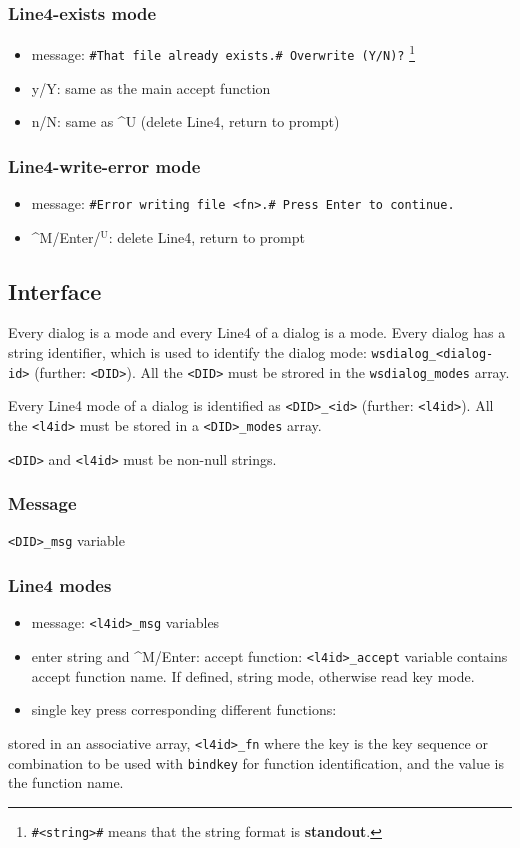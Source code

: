\documentclass[11pt]{article}
\begin{document}
\subsubsection{Line4-exists mode}
\label{sec-1-3-1}
\begin{itemize}
\item message: \texttt{\#That file already exists.\#  Overwrite (Y/N)?} \footnote{\texttt{\#<string>\#} means that the string format is \textbf{standout}.}
\item y/Y: same as the main accept function
\item n/N: same as \^{}U (delete Line4, return to prompt)
\end{itemize}

\subsubsection{Line4-write-error mode}
\label{sec-1-3-2}
\begin{itemize}
\item message: \texttt{\#Error writing file <fn>.\# Press Enter to continue.}
\item \^{}M/Enter/$^{\text{U}}$: delete Line4, return to prompt
\end{itemize}

\subsection{Interface}
\label{sec-1-4}
Every dialog is a mode and every Line4 of a dialog is a mode.  Every
dialog has a string identifier, which is used to identify the dialog
mode: \verb~wsdialog_<dialog-id>~ (further: \verb~<DID>~).  All the \verb~<DID>~ must
be strored in the \verb~wsdialog_modes~ array.

Every Line4 mode of a dialog is identified as \verb~<DID>_<id>~ (further:
\verb~<l4id>~).  All the \verb~<l4id>~ must be stored in a \verb~<DID>_modes~ array.

\verb~<DID>~ and \verb~<l4id>~ must be non-null strings.

\subsubsection{Message}
\label{sec-1-4-1}
\verb~<DID>_msg~ variable

\subsubsection{Line4 modes}
\label{sec-1-4-2}
\begin{itemize}
\item message: \verb~<l4id>_msg~ variables
\item enter string and \^{}M/Enter: accept function:
\verb~<l4id>_accept~ variable contains accept function name.
If defined, string mode, otherwise read key mode.
\item single key press corresponding different functions:
\end{itemize}
stored in an associative array, \verb~<l4id>_fn~ where the key is the
key sequence or combination to be used with \verb~bindkey~ for function
identification, and the value is the function name.
\end{document}
